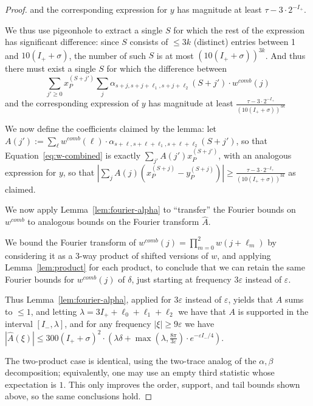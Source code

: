 \documentclass[11pt]{article}
\theoremstyle{plain}
\newcommand{\eps}{\varepsilon}
\begin{document}
\begin{proof}
and the corresponding expression for $y$ has magnitude at least $\tau-3\cdot 2^{-I_+}$.


We thus use pigeonhole to extract a single $S$ for which the rest of the expression has significant difference: since $S$ consists of $\leq 3k$ (distinct) entries between 1 and $10(I_++\sigma)$, the number of such $S$ is at most $(10(I_++\sigma))^{3k}$. And thus there must exist a single $S$ for which the difference between 
\begin{equation}\label{eq:w-combined}\sum_{j'\geq 0}x_P^{(S+j')}\sum_j \alpha_{s+j,s+j+\ell_1,s+j+\ell_2}(S+j') \cdot w^{comb}(j)\end{equation}
and the corresponding expression of $y$ has magnitude at least $\frac{\tau-3\cdot 2^{-I_+}}{(10(I_++\sigma))^{3k}}$

We now define the coefficients claimed by the lemma: let $A(j'):=\sum_\ell  w^{comb}(\ell)\cdot \alpha_{s+\ell,s+\ell+\ell_1,s+\ell+\ell_2}(S+j')$, so that Equation~\ref{eq:w-combined} is exactly
$\sum_{j'} A(j')x_P^{(S+j')}$, with an analogous expression for  $y$, so that $|\sum_j A(j)(x_P^{(S+j)}-y_P^{(S+j)})|\geq \frac{\tau-3\cdot 2^{-I_+}}{(10(I_++\sigma))^{3k}}$ as claimed.

We now apply Lemma~\ref{lem:fourier-alpha} to ``transfer'' the Fourier bounds on $w^{comb}$ to analogous bounds on the Fourier transform $\hat{A}$.

We bound the Fourier transform of $w^{comb}(j)=\prod_{m=0}^2 w(j+\ell_m)$ by considering it as a 3-way product of shifted versions of $w$, and applying  Lemma~\ref{lem:product} for each product, to conclude that we can retain the same Fourier bounds for $w^{comb}(j)$ of $\delta$, just starting at frequency $3\eps$ instead of $\eps$.

Thus Lemma~\ref{lem:fourier-alpha}, applied for $3\eps$ instead of $\eps$, yields that $A$ sums to $\leq 1$, and letting $\lambda=3I_++\ell_0+\ell_1+\ell_2$ we have that $A$ is supported in the interval $[I_-,\lambda]$, and for any frequency $|\xi|\geq 9\eps$ we have $|\hat{A}(\xi)|\leq 300 (I_++\sigma)^2\cdot\left(\lambda\delta+\max(\lambda,\frac{8\pi}{3\eps})\cdot e^{-\eps I_-/4}\right)$.

The two-product case is identical, using the two-trace analog of the
$\alpha,\beta$ decomposition; equivalently, one may use an empty third
statistic whose expectation is $1$. This only improves the order, support,
and tail bounds shown above, so the same conclusions hold.
\end{proof}
\end{document}
